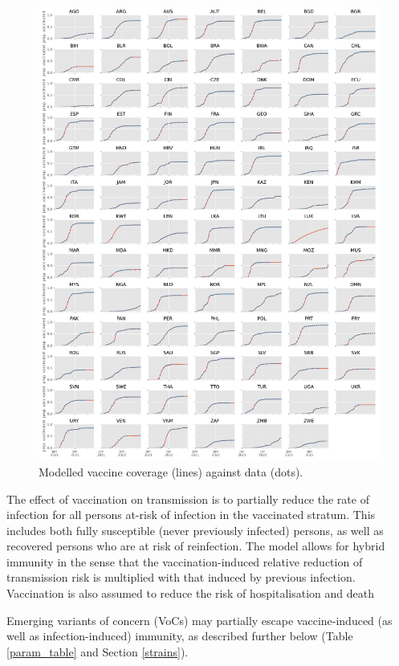 \begin{figure}[h]
    \begin{center}
    \includegraphics[width=1.0\textwidth]{../../tex_descriptions/projects/sm_covid/vacc_coverage.pdf}
    \end{center}
    \caption{Modelled vaccine coverage (lines) against data (dots).
    } 
    \label{fig:vaccination}
\end{figure}

The effect of vaccination on transmission is to partially reduce the rate of infection for all persons at-risk of infection in the vaccinated stratum.
This includes both fully susceptible (never previously infected) persons,
as well as recovered persons who are at risk of reinfection. The model allows for hybrid immunity
in the sense that the vaccination-induced relative reduction of transmission risk is multiplied with that induced by previous infection. Vaccination is also assumed to reduce the risk of hospitalisation and death 

Emerging variants of concern (VoCs) may partially escape vaccine-induced (as well as infection-induced) immunity, as described further below (Table \ref{param_table} and Section \ref{strains}).